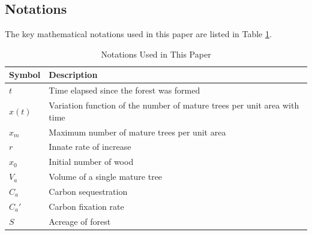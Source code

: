 \documentclass[12pt]{article}
\begin{document}
\subsection{Notations}
The key mathematical notations used in this paper are listed in Table
\ref{table1}.
\begin{table}[ht]
    \caption{Notations Used in This Paper}\label{table1}
    \begin{tabularx}{\textwidth}{>{\centering\arraybackslash}X>{\centering\arraybackslash}p{14cm}}
        \toprule
        \textbf{Symbol} & \textbf{Description}                                                     \\
        \midrule
        $t$             & Time elapsed since the forest was formed                                 \\
        \midrule
        $x(t)$          & Variation function of the number of mature trees per unit area with time \\
        \midrule
        $x_m$           & Maximum number of mature trees per unit area                             \\
        \midrule
        $r$             & Innate rate of increase
        \footnotemark[1]
        \footnotemark[2]                                                                           \\
        \midrule
        $x_0$           & Initial number of wood                                                   \\
        \midrule
        $V_a$           & Volume of a single mature tree                                           \\
        \midrule
        $C_a$           & Carbon sequestration                                                     \\
        \midrule
        $C_a'$          & Carbon fixation rate                                                     \\
        \midrule
        $S$             & Acreage of forest                                                        \\
        \bottomrule
    \end{tabularx}

\end{table}\\
\end{document}
